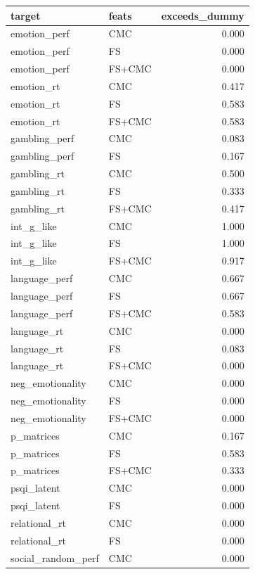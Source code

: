 \documentclass{article}
\begin{document}
%

\begin{table}
\centering
\begin{tabular}{llr}
	\toprule
	target & feats & exceeds\_dummy \\
	\midrule
	emotion\_perf & CMC & 0.000 \\
	emotion\_perf & FS & 0.000 \\
	emotion\_perf & FS+CMC & 0.000 \\
	emotion\_rt & CMC & 0.417 \\
	emotion\_rt & FS & 0.583 \\
	emotion\_rt & FS+CMC & 0.583 \\
	gambling\_perf & CMC & 0.083 \\
	gambling\_perf & FS & 0.167 \\
	gambling\_rt & CMC & 0.500 \\
	gambling\_rt & FS & 0.333 \\
	gambling\_rt & FS+CMC & 0.417 \\
	int\_g\_like & CMC & 1.000 \\
	int\_g\_like & FS & 1.000 \\
	int\_g\_like & FS+CMC & 0.917 \\
	language\_perf & CMC & 0.667 \\
	language\_perf & FS & 0.667 \\
	language\_perf & FS+CMC & 0.583 \\
	language\_rt & CMC & 0.000 \\
	language\_rt & FS & 0.083 \\
	language\_rt & FS+CMC & 0.000 \\
	neg\_emotionality & CMC & 0.000 \\
	neg\_emotionality & FS & 0.000 \\
	neg\_emotionality & FS+CMC & 0.000 \\
	p\_matrices & CMC & 0.167 \\
	p\_matrices & FS & 0.583 \\
	p\_matrices & FS+CMC & 0.333 \\
	psqi\_latent & CMC & 0.000 \\
	psqi\_latent & FS & 0.000 \\
	relational\_rt & CMC & 0.000 \\
	relational\_rt & FS & 0.000 \\
	social\_random\_perf & CMC & 0.000 \\

\end{tabular}
\end{table}
\end{document}
